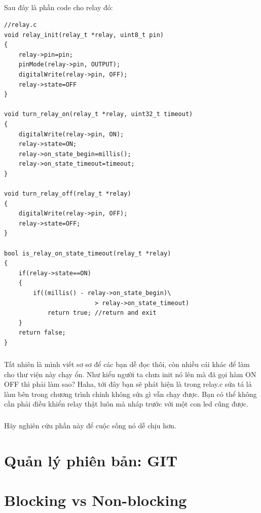 \documentclass[12pt,a5paper]{book}
\begin{document}
\paragraph{}
Sau đây là phần code cho relay đó:
\begin{lstlisting}
//relay.c
void relay_init(relay_t *relay, uint8_t pin)
{
	relay->pin=pin;
	pinMode(relay->pin, OUTPUT);
	digitalWrite(relay->pin, OFF);
	relay->state=OFF
}

void turn_relay_on(relay_t *relay, uint32_t timeout)
{
	digitalWrite(relay->pin, ON);
	relay->state=ON;
	relay->on_state_begin=millis();
	relay->on_state_timeout=timeout;
}

void turn_relay_off(relay_t *relay)
{
	digitalWrite(relay->pin, OFF);
	relay->state=OFF;
}

bool is_relay_on_state_timeout(relay_t *relay)
{
	if(relay->state==ON) 
	{
		if((millis() - relay->on_state_begin)\
						 > relay->on_state_timeout)
			return true; //return and exit
	}
	return false;
}

\end{lstlisting}
\paragraph{}
Tất nhiên là mình viết sơ sơ để các bạn dễ đọc thôi, còn nhiều cái khác để làm cho thư viện này chạy ổn. Như kiểu người ta chưa init nó lên mà đã gọi hàm ON OFF thì phải làm sao? Haha, tới đây bạn sẽ phát hiện là trong relay.c sửa tá lả làm bên trong chương trình chính không sửa gì vẫn chạy được. Bạn có thể không cần phải điều khiển relay thật luôn mà nháp trước với một con led cũng được.
\paragraph{}
Hãy nghiên cứu phần này để cuộc sống nó dễ chịu hơn.
\chapter{Quản lý phiên bản: GIT}

\chapter{Blocking vs Non-blocking}
\end{document}

